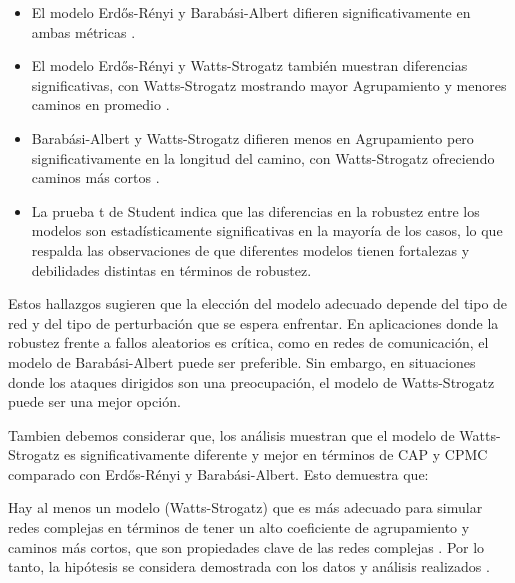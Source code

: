 \begin{itemize}
    \item El modelo Erdős-Rényi y Barabási-Albert difieren significativamente en ambas métricas .
    \item El modelo Erdős-Rényi y Watts-Strogatz también muestran diferencias significativas, con Watts-Strogatz mostrando mayor Agrupamiento y menores caminos en promedio .
    \item Barabási-Albert y Watts-Strogatz difieren menos en Agrupamiento pero significativamente en la longitud del camino, con Watts-Strogatz ofreciendo caminos más cortos .
    \item La prueba t de Student indica que las diferencias en la robustez entre los modelos son estadísticamente significativas en la mayoría de los casos, lo que respalda las observaciones de que diferentes modelos tienen fortalezas y debilidades distintas en términos de robustez.
\end{itemize}

Estos hallazgos sugieren que la elección del modelo adecuado depende del tipo de red y del tipo de perturbación que se espera enfrentar. En aplicaciones donde la robustez frente a fallos aleatorios es crítica, como en redes de comunicación, el modelo de Barabási-Albert puede ser preferible. Sin embargo, en situaciones donde los ataques dirigidos son una preocupación, el modelo de Watts-Strogatz puede ser una mejor opción.

Tambien debemos considerar que, los análisis muestran que el modelo de Watts-Strogatz es significativamente diferente y mejor en términos de CAP y CPMC comparado con Erdős-Rényi y Barabási-Albert. Esto demuestra que:

Hay al menos un modelo (Watts-Strogatz) que es más adecuado para simular redes complejas en términos de tener un alto coeficiente de agrupamiento y caminos más cortos, que son propiedades clave de las redes complejas .
Por lo tanto, la hipótesis se considera demostrada con los datos y análisis realizados .
